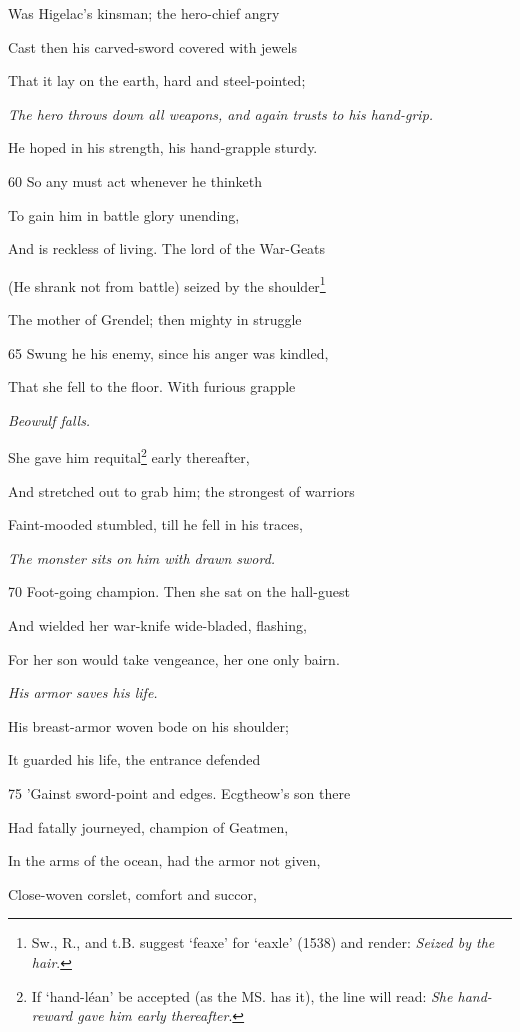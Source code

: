 Was Higelac’s kinsman; the hero-chief angry

Cast then his carved-sword covered with jewels

That it lay on the earth, hard and steel-pointed;

\emph{The hero throws
down all weapons,
and again trusts
to his hand-grip.}

He hoped in his strength, his hand-grapple sturdy.

60
So any must act whenever he thinketh

To gain him in battle glory unending,

And is reckless of living. The lord of the War-Geats

(He shrank not from battle) seized by the shoulder\footnote{Sw., R., and t.B. suggest ‘feaxe’ for ‘eaxle’ (1538) and render: \emph{Seized
by the hair}.}

The mother of Grendel; then mighty in struggle

65
Swung he his enemy, since his anger was kindled,

That she fell to the floor. With furious grapple

\emph{Beowulf falls.}

She gave him requital\footnote{If ‘hand-léan’ be accepted (as the MS. has it), the line will read: \emph{She
hand-reward gave him early thereafter}.} early thereafter,

And stretched out to grab him; the strongest of warriors

Faint-mooded stumbled, till he fell in his traces,

\emph{The monster sits
on him with drawn
sword.}

70
Foot-going champion. Then she sat on the hall-guest

And wielded her war-knife wide-bladed, flashing,

For her son would take vengeance, her one only bairn.

\emph{His armor saves
his life.}

His breast-armor woven bode on his shoulder;

It guarded his life, the entrance defended

75
’Gainst sword-point and edges. Ecgtheow’s son there

Had fatally journeyed, champion of Geatmen,

In the arms of the ocean, had the armor not given,

Close-woven corslet, comfort and succor,

